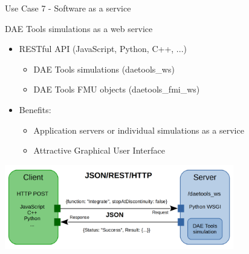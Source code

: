 \documentclass[compress,newPxFont,sthlmFooter]{beamer}
\begin{document}
\begin{frame}[plain]{Use Case 7 - Software as a service}
    \begin{center}
        \alert{DAE Tools simulations as a web service}
    \end{center}   
    
    \small {
    \begin{itemize}
        \item RESTful API (JavaScript, Python, C++, ...)
            \begin{itemize}
                \item DAE Tools simulations (daetools\_ws)
                \item DAE Tools FMU objects (daetools\_fmi\_ws)
            \end{itemize}
        \item Benefits:
            \begin{itemize}
                \item Application servers or individual simulations as a service
                \item Attractive Graphical User Interface
            \end{itemize}
    \end{itemize}
    }
    \begin{center}
        \includegraphics[align=c, width=0.75\textwidth]{daetools_web_service.png}
    \end{center}
\end{frame}
\end{document}
